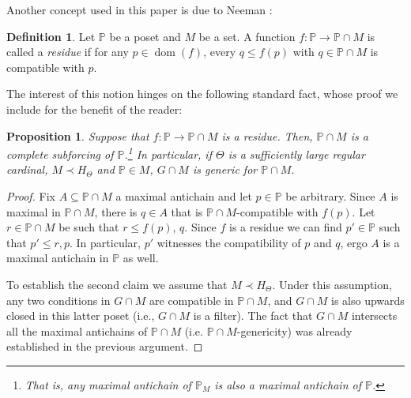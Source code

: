 \documentclass[11pt]{amsart}
\newtheorem{proposition}[theorem]{Proposition}
\theoremstyle{definition}
\newtheorem{definition}[theorem]{Definition}
\theoremstyle{remark}
\DeclareMathOperator{\dom}{dom}
\def\s{\subseteq}
\def\forces{\Vdash}
\newcommand{\one}{\mathop{1\hskip-3pt {\rm l}}}
\begin{document}
Another concept used in this paper is due to Neeman \cite{Neeman2014}:
\begin{definition}
    Let $\mathbb{P}$ be a poset and $M$ be a set. A  function $f\colon \mathbb{P}\to \mathbb{P}\cap M$ is called a \emph{residue} if for any $p\in \dom(f)$,  every $q\leq f(p)$ with $q\in \mathbb{P}\cap M$ is compatible with $p$.
\end{definition}
The interest of this notion hinges on the following standard fact, whose proof we include for the benefit of the reader:
\begin{proposition}\label{cor: submodel}
Suppose that $f\colon \mathbb{P}\to \mathbb{P}\cap M$ is a residue. Then,  $\mathbb{P}\cap M$ is a complete subforcing of $\mathbb{P}$.\footnote{That is, any maximal antichain of $\mathbb{P}_M$ is also a maximal antichain of $\mathbb{P}$.} In particular, if $\Theta$ is a sufficiently large regular cardinal, $M\prec H_\Theta$ and $\mathbb{P}\in M$, $G\cap M$ is generic for $\mathbb{P}\cap M$.
\end{proposition}
\begin{proof}
Fix $A\s \mathbb{P}\cap M$ a maximal antichain and let  $p\in \mathbb{P}$ be arbitrary. Since $A$ is maximal in $\mathbb{P}\cap M$, there is $q\in A$ that is $\mathbb{P}\cap M$-compatible with $f(p)$. Let $r\in \mathbb{P}\cap M$ be such that $r\leq f(p)$, $q$. Since $f$ is a residue  we can find $p'\in \mathbb{P}$ such that $p'\leq r, p$. In particular, $p'$ witnesses the compatibility of $p$ and $q$, ergo $A$ is a maximal antichain in $\mathbb{P}$ as well. 


To establish the second claim we assume that $M\prec H_\Theta$. Under this assumption, any two conditions in  $G\cap M$ are compatible in $\mathbb{P}\cap M$, and $G\cap M$ is also upwards closed in this latter poset (i.e., $G\cap M$ is a filter). The fact that $G\cap M$ intersects all the maximal antichains of $\mathbb{P}\cap M$ (i.e.  $\mathbb{P}\cap M$-genericity) was already established in the previous argument.
\end{proof}
            
\end{document}

